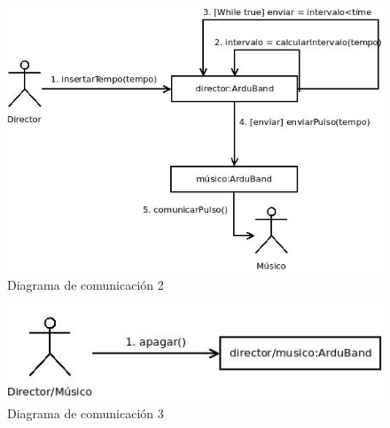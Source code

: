 \begin{figure}[htb]
\centering
\includegraphics[width=1\textwidth]{./imagenes/comunicacion2}
\caption{Diagrama de comunicación 2} \label{fig:comunicacion2}
\end{figure}


\begin{figure}[htb]
\centering
\includegraphics[width=1\textwidth]{./imagenes/comunicacion3}
\caption{Diagrama de comunicación 3} \label{fig:comunicacion3}
\end{figure}
